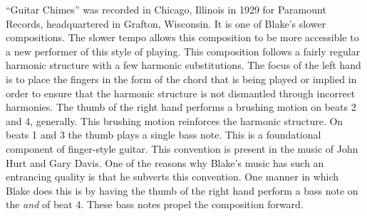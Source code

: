 \documentclass{tufte-handout}
\begin{document}
``Guitar Chimes'' was recorded in Chicago, Illinois in 1929 for Paramount
Records, headquartered in Grafton, Wisconsin. It is one of Blake's slower
compositions. The slower tempo allows this composition to be more accessible
to a new performer of this style of playing. This composition follows a fairly
regular harmonic structure with a few harmonic substitutions. The focus of the
left hand is to place the fingers in the form of the chord that is being
played or implied in order to ensure that the harmonic structure is not
dismantled through incorrect harmonies. The thumb of the right hand performs a
brushing motion on beats 2 and 4, generally. This brushing motion reinforces
the harmonic structure. On beats 1 and 3 the thumb plays a single bass
note. This is a foundational component of finger-style guitar. This convention
is present in the music of John Hurt and Gary Davis. One of the reasons why
Blake's music has such an entrancing quality is that he subverts this
convention. One manner in which Blake does this is by having the thumb of the
right hand perform a bass note on the \emph{and} of beat 4. These bass notes
propel the composition forward.
\end{document}
